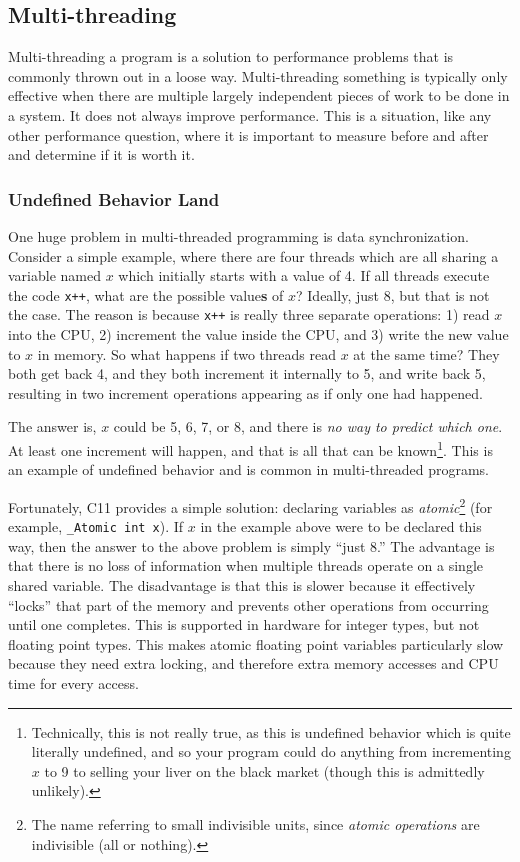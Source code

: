 \subsection{Multi-threading}

Multi-threading a program is a solution to performance problems that is commonly thrown out in a loose way. Multi-threading something is
typically only effective when there are multiple largely independent pieces of work to be done in a system. It does not always improve
performance. This is a situation, like any other performance question, where it is important to measure before and after and determine
if it is worth it.

\subsubsection{Undefined Behavior Land}

One huge problem in multi-threaded programming is data synchronization. Consider a simple example, where there are four threads which
are all sharing a variable named $x$ which initially starts with a value of 4. If all threads execute the code \texttt{x++}, what are
the possible value\textbf{s} of $x$? Ideally, just 8, but that is not the case. The reason is because \texttt{x++} is really three
separate operations: 1) read $x$ into the CPU, 2) increment the value inside the CPU, and 3) write the new value to $x$ in memory.
So what happens if two threads read $x$ at the same time? They both get back 4, and they both increment it internally to 5, and write
back 5, resulting in two increment operations appearing as if only one had happened.

The answer is, $x$ could be 5, 6, 7, or 8, and there is \textit{no way to predict which one}. At least one increment will happen, and
that is all that can be known\footnote{Technically, this is not really true, as this is undefined behavior which is quite literally undefined, and
so your program could do anything from incrementing $x$ to 9 to selling your liver on the black market (though this is admittedly unlikely).}. This is an example of undefined
behavior and is common in multi-threaded programs.

Fortunately, C11 provides a simple solution: declaring variables as \textit{atomic}\footnote{The name referring to small indivisible units, since \textit{atomic operations} are
indivisible (all or nothing).} (for example, \texttt{\_Atomic int x}). If $x$ in
the example above were to be declared this way, then the answer to the above problem is simply ``just 8.'' The advantage is that there
is no loss of information when multiple threads operate on a single shared variable. The disadvantage is that this is slower because
it effectively ``locks'' that part of the memory and prevents other operations from occurring until one completes. This is supported
in hardware for integer types, but not floating point types. This makes atomic floating point variables particularly slow because they
need extra locking, and therefore extra memory accesses and CPU time for every access.

